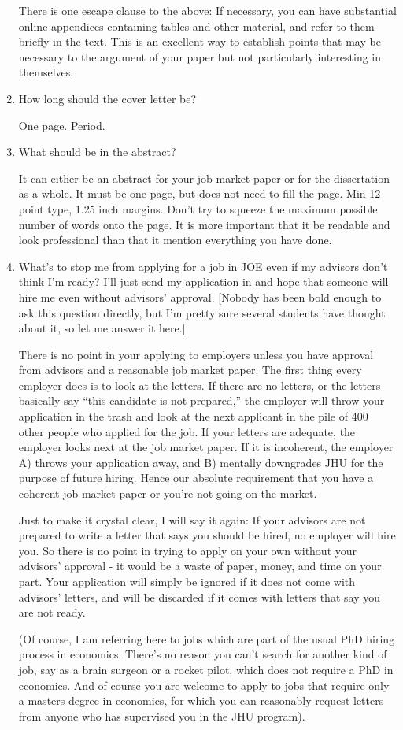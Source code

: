 \documentclass{econtex}
\begin{document}
\begin{enumerate}
  There is one escape clause to the above: If necessary, you can have
  substantial online appendices containing tables and other material, and
  refer to them briefly in the text.  This is an excellent way to
  establish points that may be necessary to the argument of your paper
  but not particularly interesting in themselves.   

\item How long should the cover letter be?

  One page.  Period.

\item What should be in the abstract?

  It can either be an abstract for your job market paper or for the dissertation 
as a whole.  It must be one page, but does not need to fill the page.  Min 12 point
type, 1.25 inch margins.  Don't try to squeeze the maximum possible number of words onto
the page.  It is more important that it be readable and look professional than that 
it mention everything you have done.

\item What's to stop me from applying for a job in JOE even if my advisors don't think I'm ready?  I'll just send 
my application in and hope that someone will hire me even without advisors' approval.  [Nobody 
has been bold enough to ask this question directly, but I'm pretty sure several students have thought about it,
so let me answer it here.]

There is no point in your applying to employers unless you have
approval from advisors and a reasonable job market paper.  The first
thing every employer does is to look at the letters.  If there are no
letters, or the letters basically say ``this candidate is not
prepared,'' the employer will throw your application in the trash and
look at the next applicant in the pile of 400 other people who applied
for the job.  If your letters are adequate, the employer looks next at
the job market paper.  If it is incoherent, the employer A) throws
your application away, and B) mentally downgrades JHU for the purpose
of future hiring.  Hence our absolute requirement that you have a coherent
job market paper or you're not going on the market.

Just to make it crystal clear, I will say it again: If your advisors
are not prepared to write a letter that says you should be hired, no
employer will hire you.  So there is no point in trying to apply on
your own without your advisors' approval - it would be a waste of
paper, money, and time on your part.  Your application will simply be
ignored if it does not come with advisors' letters, and will be discarded
if it comes with letters that say you are not ready.

(Of course, I am referring here to jobs which are part of the usual PhD hiring 
process in economics.  There's no reason you can't search for another kind of 
job, say as a brain surgeon or a rocket pilot, which does not require a 
PhD in economics.  And of course you are welcome to apply to jobs that require 
only a masters degree in economics, for which you can reasonably request letters 
from anyone who has supervised you in the JHU program).  


\end{enumerate}
\end{document}
